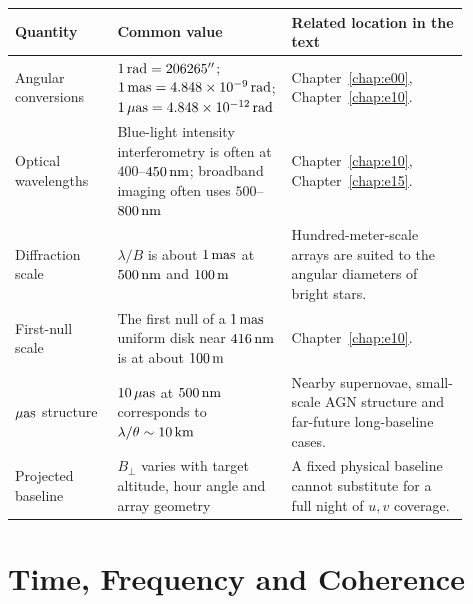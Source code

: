 \begin{longtable}{p{0.22\linewidth}p{0.30\linewidth}p{0.38\linewidth}}
\toprule
Quantity & Common value & Related location in the text \\
\midrule
Angular conversions & \(1\,{\rm rad}=206265''\); \(1\,{\rm mas}=4.848\times10^{-9}\,{\rm rad}\); \(1\,\mu{\rm as}=4.848\times10^{-12}\,{\rm rad}\) & Chapter~\ref{chap:e00}, Chapter~\ref{chap:e10}. \\
Optical wavelengths & Blue-light intensity interferometry is often at \(400\)--\(450\,{\rm nm}\); broadband imaging often uses \(500\)--\(800\,{\rm nm}\) & Chapter~\ref{chap:e10}, Chapter~\ref{chap:e15}. \\
Diffraction scale & \(\lambda/B\) is about \(1\,{\rm mas}\) at \(500\,{\rm nm}\) and \(100\,{\rm m}\) & Hundred-meter-scale arrays are suited to the angular diameters of bright stars. \\
First-null scale & The first null of a \(1\,{\rm mas}\) uniform disk near \(416\,{\rm nm}\) is at about \(100\,{\rm m}\) & Chapter~\ref{chap:e10}. \\
\(\mu{\rm as}\) structure & \(10\,\mu{\rm as}\) at \(500\,{\rm nm}\) corresponds to \(\lambda/\theta\sim10\,{\rm km}\) & Nearby supernovae, small-scale AGN structure and far-future long-baseline cases. \\
Projected baseline & \(B_\perp\) varies with target altitude, hour angle and array geometry & A fixed physical baseline cannot substitute for a full night of \(u,v\) coverage. \\
\bottomrule
\end{longtable}

\section{Time, Frequency and Coherence}
\label{appsec:b-time}

